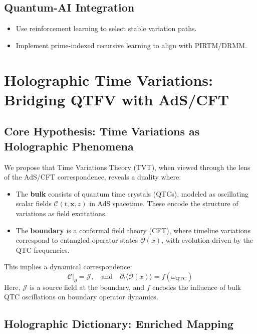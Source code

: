 \documentclass{article}
\theoremstyle{plain}
\theoremstyle{claimstyle}
\begin{document}
\subsection{Quantum-AI Integration}
\begin{itemize}
    \item Use reinforcement learning to select stable variation paths.
    \item Implement prime-indexed recursive learning to align with PIRTM/DRMM.
\end{itemize}

\section{Holographic Time Variations: Bridging QTFV with AdS/CFT}

\subsection{Core Hypothesis: Time Variations as Holographic Phenomena}

We propose that Time Variations Theory (TVT), when viewed through the lens of the AdS/CFT correspondence, reveals a duality where:

\begin{itemize}
    \item The \textbf{bulk} consists of quantum time crystals (QTCs), modeled as oscillating scalar fields \( \mathcal{C}(t, \mathbf{x}, z) \) in AdS spacetime. These encode the structure of variations as field excitations.
    \item The \textbf{boundary} is a conformal field theory (CFT), where timeline variations correspond to entangled operator states \( \mathcal{O}(x) \), with evolution driven by the QTC frequencies.
\end{itemize}

This implies a dynamical correspondence:
\begin{equation}
\mathcal{C}|_{\partial} = \mathcal{J}, \quad \text{and} \quad \partial_t \langle \mathcal{O}(x) \rangle = f(\omega_{\text{QTC}})
\end{equation}
Here, \( \mathcal{J} \) is a source field at the boundary, and \( f \) encodes the influence of bulk QTC oscillations on boundary operator dynamics.

\subsection{Holographic Dictionary: Enriched Mapping}
\end{document}
